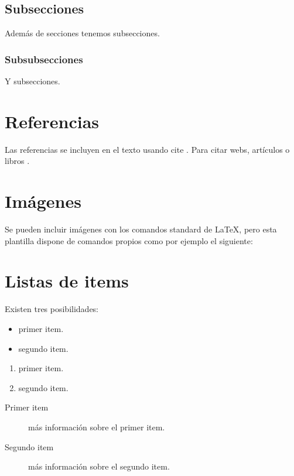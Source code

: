 \subsection{Subsecciones}

Además de secciones tenemos subsecciones.

\subsubsection{Subsubsecciones}

Y subsecciones. 


\section{Referencias}

Las referencias se incluyen en el texto usando cite \cite{wiki:latex}. Para citar webs, artículos o libros \cite{koza92}.


\section{Imágenes}

Se pueden incluir imágenes con los comandos standard de \LaTeX, pero esta plantilla dispone de comandos propios como por ejemplo el siguiente:


\section{Listas de items}

Existen tres posibilidades:

\begin{itemize}
	\item primer item.
	\item segundo item.
\end{itemize}

\begin{enumerate}
	\item primer item.
	\item segundo item.
\end{enumerate}

\begin{description}
	\item[Primer item] más información sobre el primer item.
	\item[Segundo item] más información sobre el segundo item.
\end{description}
	
